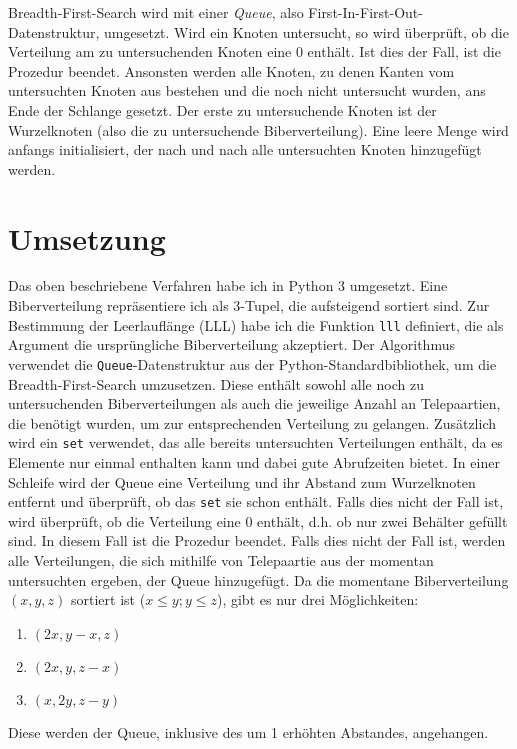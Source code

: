 \documentclass[a4paper,10pt,ngerman]{scrartcl}
\begin{document}
Breadth-First-Search wird mit einer \textit{Queue}, also First-In-First-Out-Datenstruktur, umgesetzt.
Wird ein Knoten untersucht, so wird überprüft, ob die Verteilung am zu untersuchenden Knoten eine 0 enthält. Ist dies der Fall, ist die Prozedur beendet.
Ansonsten werden alle Knoten, zu denen Kanten vom untersuchten Knoten aus bestehen und die noch nicht untersucht wurden, ans Ende der Schlange gesetzt.
Der erste zu untersuchende Knoten ist der Wurzelknoten (also die zu untersuchende Biberverteilung).
Eine leere Menge wird anfangs initialisiert, der nach und nach alle untersuchten Knoten hinzugefügt werden.

\section{Umsetzung}
Das oben beschriebene Verfahren habe ich in Python 3 umgesetzt.
Eine Biberverteilung repräsentiere ich als 3-Tupel, die aufsteigend sortiert sind.
Zur Bestimmung der Leerlauflänge (LLL) habe ich die Funktion \texttt{lll} definiert, die als Argument die ursprüngliche Biberverteilung akzeptiert.
Der Algorithmus verwendet die \texttt{Queue}-Datenstruktur aus der Python-Standardbibliothek, um die Breadth-First-Search umzusetzen.
Diese enthält sowohl alle noch zu untersuchenden Biberverteilungen als auch die jeweilige Anzahl an Telepaartien, die benötigt wurden, um zur entsprechenden Verteilung zu gelangen.
Zusätzlich wird ein \texttt{set} verwendet, das alle bereits untersuchten Verteilungen enthält, da es Elemente nur einmal enthalten kann und dabei gute Abrufzeiten bietet.
In einer Schleife wird der Queue eine Verteilung und ihr Abstand zum Wurzelknoten entfernt und überprüft, ob das \texttt{set} sie schon enthält.
Falls dies nicht der Fall ist, wird überprüft, ob die Verteilung eine 0 enthält, d.h. ob nur zwei Behälter gefüllt sind.
In diesem Fall ist die Prozedur beendet.
Falls dies nicht der Fall ist, werden alle Verteilungen, die sich mithilfe von Telepaartie aus der momentan untersuchten ergeben, der Queue hinzugefügt.
Da die momentane Biberverteilung $(x,y,z)$ sortiert ist ($x\le y; y\le z$), gibt es nur drei Möglichkeiten:
\begin{enumerate}
  \item $(2x,y-x,z)$
  \item $(2x,y,z-x)$
  \item $(x,2y,z-y)$
\end{enumerate}
Diese werden der Queue, inklusive des um 1 erhöhten Abstandes, angehangen.
\end{document}

